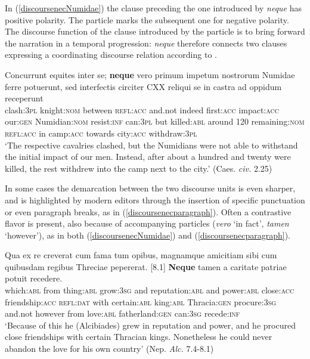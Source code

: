 \documentclass[output=paper,modfonts,nonflat,citecolor=brown,
showindex
]{langsci/langscibook}
\begin{document}
In (\ref{discoursenecNumidae}) the clause preceding the one introduced by {\emph{neque}} has positive polarity. The particle marks the subsequent one for negative polarity. The discourse function of the clause introduced by the particle is to bring forward the narration in a temporal progression: {\emph{neque}} therefore connects two clauses expressing a coordinating discourse relation according to \citet[]{Asher93}.

{\begin{exe}
\ex \label{discoursenecNumidae} \gll Concurrunt equites inter se; {\textbf{neque}} vero primum impetum nostrorum Numidae ferre potuerunt, sed interfectis circiter CXX reliqui se in castra ad oppidum receperunt\\
clash:{\textsc{3pl}} knight:{\textsc{nom}} between {\textsc{refl}}:{\textsc{acc}} and.not indeed first:{\textsc{acc}} impact:{\textsc{acc}} our:{\textsc{gen}} Numidian:{\textsc{nom}} resist:{\textsc{inf}} can:{\textsc{3pl}} but killed:{\textsc{abl}} around 120 remaining:{\textsc{nom}} {\textsc{refl}}:{\textsc{acc}} in camp:{\textsc{acc}} towards city:{\textsc{acc}} withdraw:{\textsc{3pl}}\\

`The respective cavalries clashed, but the Numidians were not able to withstand the initial impact of our men. Instead, after about a hundred and twenty were killed, the rest withdrew into the camp next to the city.' (Caes. {\emph{civ.}} 2.25)
\end{exe}}

\noindent In some cases the demarcation between the two discourse units is even sharper, and is highlighted by modern editors through the insertion of specific punctuation or even paragraph breaks, as in (\ref{discoursenecparagraph}). Often a contrastive flavor is present, also because of accompanying particles ({\emph{vero}} `in fact', {\emph{tamen}} `however'), as in both (\ref{discoursenecNumidae}) and (\ref{discoursenecparagraph}).

{\begin{exe}
\ex \label{discoursenecparagraph} \gll [7.4] Qua ex re creverat cum fama tum opibus, magnamque amicitiam sibi cum quibusdam regibus Threciae pepererat. [8.1] {\textbf{Neque}} tamen a caritate patriae potuit recedere.\\
\hspace{10 mm} which:{\textsc{abl}} from thing:{\textsc{abl}} grow:{\textsc{3sg}} and reputation:{\textsc{abl}} and power:{\textsc{abl}} close:{\textsc{acc}} friendship:{\textsc{acc}} {\textsc{refl:dat}} with certain:{\textsc{abl}} king:{\textsc{abl}} Thracia:{\textsc{gen}} procure:{\textsc{3sg}} \hspace{10 mm} and.not however from love:{\textsc{abl}} fatherland:{\textsc{gen}} can:{\textsc{3sg}} recede:{\textsc{inf}}\\

`Because of this he (Alcibiades) grew in reputation and power, and he procured close friendships with certain Thracian kings. Nonetheless he could never abandon the love for his own country'
(Nep. {\emph{Alc.}} 7.4-8.1)
\end{exe}}
\end{document}
